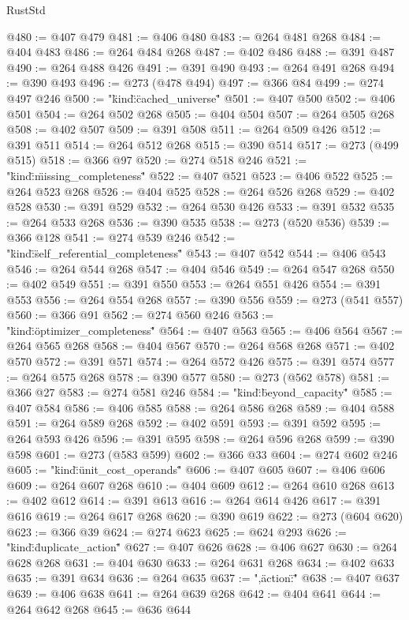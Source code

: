 \begin{lexlean}{RustStd}
\begin{coremodule}
{{{@480 := @407 @479
@481 := @406 @480
@483 := @264 @481 @268
@484 := @404 @483
@486 := @264 @484 @268
@487 := @402 @486
@488 := @391 @487
@490 := @264 @488 @426
@491 := @391 @490
@493 := @264 @491 @268
@494 := @390 @493
@496 := @273 (@478 @494)
@497 := @366 @84
@499 := @274 @497 @246
@500 := "{\"kind\":\"cached_universe\""
@501 := @407 @500
@502 := @406 @501
@504 := @264 @502 @268
@505 := @404 @504
@507 := @264 @505 @268
@508 := @402 @507
@509 := @391 @508
@511 := @264 @509 @426
@512 := @391 @511
@514 := @264 @512 @268
@515 := @390 @514
@517 := @273 (@499 @515)
@518 := @366 @97
@520 := @274 @518 @246
@521 := "{\"kind\":\"missing_completeness\""
@522 := @407 @521
@523 := @406 @522
@525 := @264 @523 @268
@526 := @404 @525
@528 := @264 @526 @268
@529 := @402 @528
@530 := @391 @529
@532 := @264 @530 @426
@533 := @391 @532
@535 := @264 @533 @268
@536 := @390 @535
@538 := @273 (@520 @536)
@539 := @366 @128
@541 := @274 @539 @246
@542 := "{\"kind\":\"self_referential_completeness\""
@543 := @407 @542
@544 := @406 @543
@546 := @264 @544 @268
@547 := @404 @546
@549 := @264 @547 @268
@550 := @402 @549
@551 := @391 @550
@553 := @264 @551 @426
@554 := @391 @553
@556 := @264 @554 @268
@557 := @390 @556
@559 := @273 (@541 @557)
@560 := @366 @91
@562 := @274 @560 @246
@563 := "{\"kind\":\"optimizer_completeness\""
@564 := @407 @563
@565 := @406 @564
@567 := @264 @565 @268
@568 := @404 @567
@570 := @264 @568 @268
@571 := @402 @570
@572 := @391 @571
@574 := @264 @572 @426
@575 := @391 @574
@577 := @264 @575 @268
@578 := @390 @577
@580 := @273 (@562 @578)
@581 := @366 @27
@583 := @274 @581 @246
@584 := "{\"kind\":\"beyond_capacity\""
@585 := @407 @584
@586 := @406 @585
@588 := @264 @586 @268
@589 := @404 @588
@591 := @264 @589 @268
@592 := @402 @591
@593 := @391 @592
@595 := @264 @593 @426
@596 := @391 @595
@598 := @264 @596 @268
@599 := @390 @598
@601 := @273 (@583 @599)
@602 := @366 @33
@604 := @274 @602 @246
@605 := "{\"kind\":\"unit_cost_operands\""
@606 := @407 @605
@607 := @406 @606
@609 := @264 @607 @268
@610 := @404 @609
@612 := @264 @610 @268
@613 := @402 @612
@614 := @391 @613
@616 := @264 @614 @426
@617 := @391 @616
@619 := @264 @617 @268
@620 := @390 @619
@622 := @273 (@604 @620)
@623 := @366 @39
@624 := @274 @623
@625 := @624 @293
@626 := "{\"kind\":\"duplicate_action\""
@627 := @407 @626
@628 := @406 @627
@630 := @264 @628 @268
@631 := @404 @630
@633 := @264 @631 @268
@634 := @402 @633
@635 := @391 @634
@636 := @264 @635
@637 := ",\"action\":\""
@638 := @407 @637
@639 := @406 @638
@641 := @264 @639 @268
@642 := @404 @641
@644 := @264 @642 @268
@645 := @636 @644
}}}}}}}}}}
\end{coremodule}
\end{lexlean}

